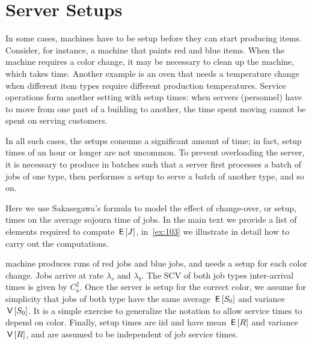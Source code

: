 \documentclass[stochastic-or.tex]{subfiles}
\begin{document}
\section{Server Setups}
\label{sec:setups-batch-proc}

In some cases, machines have to be setup before they can start producing items.
Consider, for instance, a machine that paints red and blue items.
When the machine requires a color change, it may be necessary to clean up the machine, which takes time.
Another example is an oven that needs a temperature change when different item types require different production temperatures.
Service operations form another setting with setup times: when servers (personnel) have to move from one part of a building to another, the time spent moving cannot be spent on serving customers.


In all such cases, the setups consume a significant amount of time; in fact, setup times of an hour or longer are not uncommon.
To prevent overloading the server, it is necessary to produce in batches such that a server first processes a batch of jobs of one type, then performes a setup to serve a batch of another type, and so on.

Here we use Sakasegawa's formula to model the effect of change-over, or setup, times on the average sojourn time of jobs.
In the main text we provide a list of elements required to compute $\,\mathsf{E}\left[J\right]$, in~\cref{ex:103} we illustrate in detail how to carry out the computations.

 machine produces runs of red jobs and blue jobs, and needs a setup for each color change.
Jobs arrive at rate $\lambda_r$ and $\lambda_b$.
The SCV of both job types inter-arrival times is given by $C_a^2$.
Once the server is setup for the correct color, we assume for simplicity that jobs of both type have the same average  $\,\mathsf{E}\left[S_0\right]$ and variance $\,\mathsf{V}\left[S_0\right]$.
It is a simple exercise to generalize the notation to allow service times to depend on color.
Finally, setup times are iid and have mean $\,\mathsf{E}\left[R\right]$ and variance $\,\mathsf{V}\left[R\right]$, and are assumed to be independent of job service times.
\end{document}
